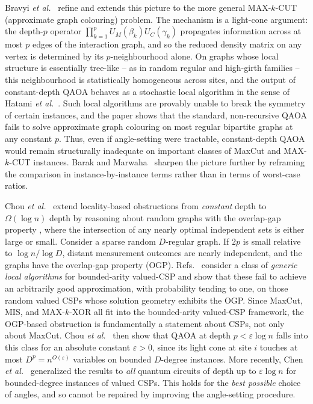 \documentclass[twocolumn,
english,
aps,
pra,
10pt,
longbibliography,
superscriptaddress,
amsmath,
amssymb,
floatfix
]{revtex4-2}
\begin{document}
Bravyi \emph{et al.}~\cite{BravyiKlieschKoenigTang2022} refine and extends this picture to the more general MAX-$k$-CUT (approximate graph colouring) problem.
The mechanism is a light-cone argument: the depth-$p$ operator $\prod_{k=1}^{p}U_M(\beta_k)U_C(\gamma_k)$ propagates information across at most $p$ edges of the interaction graph, and so the reduced density matrix on any vertex is determined by its $p$-neighbourhood alone.
On graphs whose local structure is essentially tree-like -- as in random regular and high-girth families -- this neighbourhood is statistically homogeneous across sites, and the output of constant-depth QAOA behaves as a stochastic local algorithm in the sense of Hatami \emph{et al.}~\cite{Hatami2014}.
Such local algorithms are provably unable to break the symmetry of certain instances, and the paper shows that the standard, non-recursive QAOA fails to solve approximate graph colouring on most regular bipartite graphs at any constant $p$. 
Thus, even if angle-setting were tractable, constant-depth QAOA would remain structurally inadequate on important classes of MaxCut and MAX-$k$-CUT instances.
Barak and Marwaha~\cite{BarakMarwaha2022} sharpen the picture further by reframing the comparison in instance-by-instance terms rather than in terms of worst-case ratios.

Chou \emph{et al.}~\cite{ChouLoveSandhuShi2021} extend locality-based obstructions from \emph{constant} depth to $\Omega(\log n)$ depth by reasoning about random graphs with the overlap-gap property \cite{Mezard2005,Achlioptas2011,Gamarnik2014,Gamarnik2019,Gamarnik2021}, where the intersection of any nearly optimal independent sets is either large or small.
Consider a sparse random $D$-regular graph. If $2p$ is small relative to $\log n/\log D$, distant measurement outcomes are nearly independent, and the graphs have \cite{Gamarnik2014,Gamarnik2019,Gamarnik2021} the overlap-gap property (OGP). 
Refs.~\cite{Gamarnik2014,Gamarnik2019,Gamarnik2021} consider a class of \emph{generic local algorithms} for bounded-arity valued-CSP and show that these fail to achieve an arbitrarily good approximation, with probability tending to one, on those random valued CSPs whose solution geometry exhibits the OGP.
Since MaxCut, MIS, and MAX-$k$-XOR all fit into the bounded-arity valued-CSP framework, the OGP-based obstruction is fundamentally a statement about CSPs, not only about MaxCut.
Chou \emph{et al.}~\cite{ChouLoveSandhuShi2021} then show that 
QAOA at depth $p<\varepsilon\log n$ falls into this class for an absolute constant $\varepsilon>0$, since its light cone at site $i$ touches at most $D^p=n^{O(\varepsilon)}$ variables on bounded $D$-degree instances. 
More recently, Chen \emph{et al.}~\cite{ChenHuangMarwaha2023} generalized the results to \emph{all} quantum circuits of depth up to $\varepsilon\log n$ for bounded-degree instances of valued CSPs.
This holds for the \emph{best possible} choice of angles, and so cannot be repaired by improving the angle-setting procedure.
\end{document}
